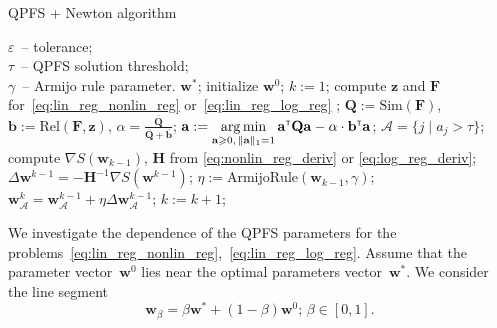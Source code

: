 \documentclass[a4paper,12pt]{article}
\renewcommand{\geq}{\ensuremath{\geqslant}}
\theoremstyle{plain} %
\theoremstyle{definition} %
\theoremstyle{remark} %
\newcommand{\ba}{\mathbf{a}}
\newcommand{\bb}{\mathbf{b}}
\newcommand{\bw}{\mathbf{w}}
\newcommand{\bz}{\mathbf{z}}
\newcommand{\cA}{\mathcal{A}}
\newcommand{\bQ}{\mathbf{Q}}
\newcommand{\bH}{\mathbf{H}}
\newcommand{\bF}{\mathbf{F}}
\newcommand{\T}{{\text{\tiny\sffamily\upshape\mdseries T}}}
\newcommand{\argmin}{\mathop{\arg \min}\limits}
\begin{document}
  	
  	\begin{algorithm}
  		\caption{QPFS + Newton algorithm}
  		\label{pc:QPFSNewton}
  		\begin{algorithmic}
  			\REQUIRE $\varepsilon$~-- tolerance;\\
  			\hspace{1.53cm}$\tau$~-- QPFS solution threshold;\\
  			\hspace{1.53cm}$\gamma$~-- Armijo rule parameter.
  			\ENSURE $\bw^*$;
  			\STATE  initialize $\bw^0$;
  			\STATE $k := 1$;
  			\REPEAT
  			\STATE compute $\bz$ and $\bF$ for~\eqref{eq:lin_reg_nonlin_reg} or~\eqref{eq:lin_reg_log_reg} ;
  			\vspace{0.1cm}
  			\STATE $\bQ := \text{Sim} (\bF)$, $\bb := \text{Rel}(\bF, \bz)$, $\alpha = \frac{\overline{\bQ}}{\overline{\bQ} + \overline{\bb}}$;
  			\vspace{0.1cm}
  			\STATE $\ba := \argmin_{\ba \geq 0, \, \|\ba\|_1=1}\ba^{\T} \bQ \ba - \alpha \cdot \mathbf{b}^{\T} \ba$;
  			\vspace{0.1cm}
  			\STATE $\cA = \{j \mid a_j > \tau\}$;
  			\vspace{0.1cm}
  			\STATE compute $\nabla S(\bw_{k-1})$, $\bH$ from \eqref{eq:nonlin_reg_deriv} or \eqref{eq:log_reg_deriv};
  			\vspace{0.1cm}
  			\STATE $\Delta \bw^{k-1} = - \bH^{-1} \nabla S(\bw^{k-1})$;
  			\vspace{0.1cm}
  			\STATE $\eta := \text{ArmijoRule}(\bw_{k-1}, \gamma)$;
  			\vspace{0.1cm}
  			\STATE $\bw_{\cA}^k = \bw_{\cA}^{k - 1} + \eta \Delta \bw_{\cA}^{k - 1}$;
  			\vspace{0.1cm}
  			\STATE $k := k + 1$;
  			\vspace{0.1cm}
  			\UNTIL{$\frac{\| \bw^k - \bw^{k-1} \|}{\| \bw^k \|} < \varepsilon$}
  		\end{algorithmic}
  	\end{algorithm}
  	
  	We investigate the dependence of the QPFS parameters for the problems~\eqref{eq:lin_reg_nonlin_reg},~\eqref{eq:lin_reg_log_reg}. 
  	Assume that the parameter vector~$\bw^0$ lies near the optimal parameters vector~$\bw^*$. 
  	We consider the line segment
  	\[
  	\bw_{\beta} = \beta \bw^* + (1 - \beta) \bw^0; \, \beta \in [0, 1] .
  	\]
  	
\end{document}
